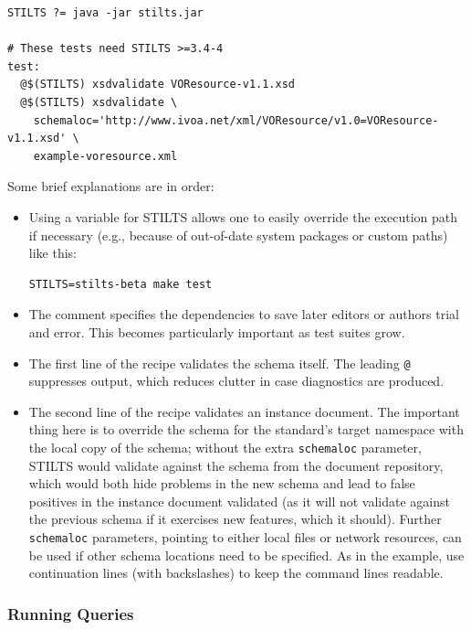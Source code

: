\documentclass[11pt,a4paper]{ivoa}
\begin{document}
\begin{lstlisting}[basicstyle=\footnotesize]
STILTS ?= java -jar stilts.jar

# These tests need STILTS >=3.4-4
test:
  @$(STILTS) xsdvalidate VOResource-v1.1.xsd
  @$(STILTS) xsdvalidate \
    schemaloc='http://www.ivoa.net/xml/VOResource/v1.0=VOResource-v1.1.xsd' \
    example-voresource.xml
\end{lstlisting}

Some brief explanations are in order:

\begin{itemize}
\item Using a variable for STILTS allows one to easily override the
execution path if necessary (e.g., because of out-of-date system
packages or custom paths) like this:

\begin{lstlisting}
STILTS=stilts-beta make test
\end{lstlisting}

\item The comment specifies the dependencies to save later editors or
authors trial and error.  This becomes particularly important as test
suites grow.

\item The first line of the recipe validates the schema itself.  The
leading \verb|@| suppresses output, which reduces clutter in case
diagnostics are produced.

\item The second line of the recipe validates an instance document.  The
important thing here is to override the schema for the standard's target
namespace with the local copy of the schema; without the extra
\verb|schemaloc| parameter, STILTS would validate against the schema
from the document repository, which would both hide problems in the new
schema and lead to false positives in the instance document validated
(as it will not validate against the previous schema if it exercises new
features, which it should).  Further \verb|schemaloc| parameters,
pointing to either local files or network resources,
can be used if other schema locations need to be specified.
As in the example, use continuation lines (with backslashes)
to keep the command lines readable.

\end{itemize}

\subsubsection{Running Queries}
\end{document}
